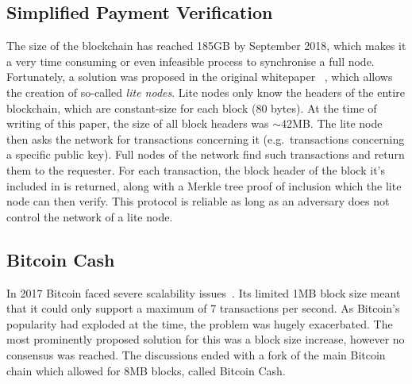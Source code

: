 \subsection{Simplified Payment Verification}
The size of the blockchain has reached 185GB by September 2018, which makes it a very time consuming or even infeasible process to synchronise a full node. Fortunately, a solution was proposed in the original whitepaper ~\cite{bitcoin}, which allows the creation of so-called \textit{lite nodes}.  Lite nodes only know the headers of the entire blockchain, which are constant-size for each block (80 bytes). At the time of writing of this paper, the size of all block headers was $\sim$42MB. The lite node then asks the network for transactions concerning it (e.g.\ transactions concerning a specific public key). Full nodes of the network find such transactions and return them to the requester. For each transaction, the block header of the block it's included in is returned, along with a Merkle tree proof of inclusion which the lite node can then verify. This protocol is reliable as long as an adversary does not control the network of a lite node.

\subsection{Bitcoin Cash}
In 2017 Bitcoin faced severe scalability issues~\cite{onscaling}. Its limited 1MB block size meant that it could only support a maximum of 7 transactions per second. As Bitcoin's popularity had exploded at the time, the problem was hugely exacerbated. The most prominently proposed solution for this was a block size increase, however no consensus was reached. The discussions ended with a fork of the main Bitcoin chain which allowed for 8MB blocks, called Bitcoin Cash.
